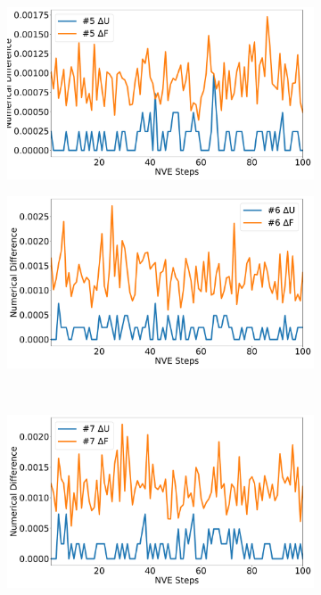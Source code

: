 \begin{figure}[htbp]
\begin{subfigure}{0.48\textwidth}
\end{subfigure}
\\
\begin{subfigure}{0.48\textwidth}
\includegraphics[width=\linewidth]{figs/rerun5.pdf}
\end{subfigure}
\begin{subfigure}{0.48\textwidth}
\includegraphics[width=\linewidth]{figs/rerun6.pdf}
\end{subfigure}
\\
\begin{subfigure}{0.48\textwidth}
\includegraphics[width=\linewidth]{figs/rerun7.pdf}

\end{subfigure}
\end{figure}
